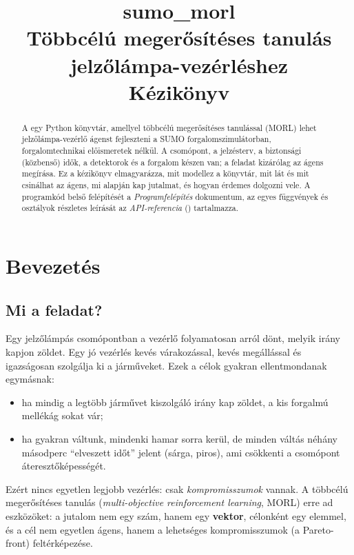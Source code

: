 \documentclass[11pt,a4paper]{article}
\title{\textbf{sumo\_morl}\\[6pt]
\Large Többcélú megerősítéses tanulás jelzőlámpa-vezérléshez\\[4pt]
\large Kézikönyv}
\date{}
\begin{document}
\maketitle
\thispagestyle{empty}

\begin{abstract}
\noindent A  egy Python könyvtár, amellyel többcélú megerősítéses tanulással (MORL)
lehet jelzőlámpa-vezérlő ágenst fejleszteni a SUMO forgalomszimulátorban, forgalomtechnikai
előismeretek nélkül. A csomópont, a jelzésterv, a biztonsági (közbenső) idők, a detektorok és a
forgalom készen van; a feladat kizárólag az ágens megírása. Ez a kézikönyv elmagyarázza, mit
modellez a könyvtár, mit lát és mit csinálhat az ágens, mi alapján kap jutalmat, és hogyan érdemes
dolgozni vele. A programkód belső felépítését a \emph{Programfelépítés} dokumentum, az egyes
függvények és osztályok részletes leírását az \emph{API-referencia} ()
tartalmazza.
\end{abstract}

\tableofcontents
\newpage

\section{Bevezetés}

\subsection{Mi a feladat?}

Egy jelzőlámpás csomópontban a vezérlő folyamatosan arról dönt, melyik irány kapjon zöldet. Egy
jó vezérlés kevés várakozással, kevés megállással és igazságosan szolgálja ki a járműveket.
Ezek a célok gyakran ellentmondanak egymásnak:

\begin{itemize}
  \item ha mindig a legtöbb járművet kiszolgáló irány kap zöldet, a kis forgalmú mellékág sokat vár;
  \item ha gyakran váltunk, mindenki hamar sorra kerül, de minden váltás néhány másodperc
        \enquote{elveszett időt} jelent (sárga, piros), ami csökkenti a csomópont áteresztőképességét.
\end{itemize}

Ezért nincs egyetlen legjobb vezérlés: csak \emph{kompromisszumok} vannak. A többcélú
megerősítéses tanulás (\emph{multi-objective reinforcement learning}, MORL) erre ad eszközöket: a
jutalom nem egy szám, hanem egy \textbf{vektor}, célonként egy elemmel, és a cél nem egyetlen ágens,
hanem a lehetséges kompromisszumok (a Pareto-front) feltérképezése.
\end{document}
